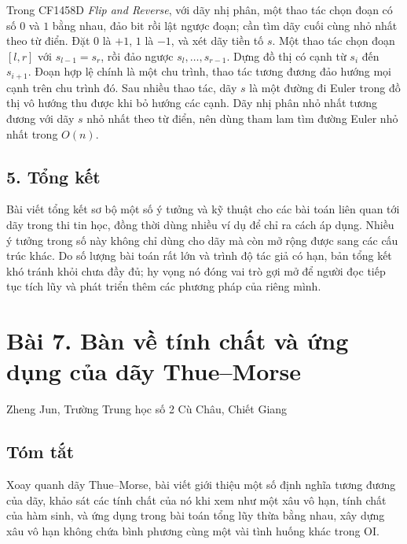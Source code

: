 \documentclass[11pt]{article}
\begin{document}
Trong CF1458D \emph{Flip and Reverse}, với dãy nhị phân, một thao tác chọn
đoạn có số \(0\) và \(1\) bằng nhau, đảo bit rồi lật ngược đoạn; cần tìm dãy
cuối cùng nhỏ nhất theo từ điển. Đặt \(0\) là \(+1\), \(1\) là \(-1\), và xét
dãy tiền tố \(s\). Một thao tác chọn đoạn \([l,r]\) với \(s_{l-1}=s_r\), rồi
đảo ngược \(s_l,\ldots,s_{r-1}\). Dựng đồ thị có cạnh từ \(s_i\) đến
\(s_{i+1}\). Đoạn hợp lệ chính là một chu trình, thao tác tương đương đảo hướng
mọi cạnh trên chu trình đó. Sau nhiều thao tác, dãy \(s\) là một đường đi Euler
trong đồ thị vô hướng thu được khi bỏ hướng các cạnh. Dãy nhị phân nhỏ nhất
tương đương với dãy \(s\) nhỏ nhất theo từ điển, nên dùng tham lam tìm đường
Euler nhỏ nhất trong \(O(n)\).

\subsection*{5. Tổng kết}

Bài viết tổng kết sơ bộ một số ý tưởng và kỹ thuật cho các bài toán liên quan
tới dãy trong thi tin học, đồng thời dùng nhiều ví dụ để chỉ ra cách áp dụng.
Nhiều ý tưởng trong số này không chỉ dùng cho dãy mà còn mở rộng được sang các
cấu trúc khác. Do số lượng bài toán rất lớn và trình độ tác giả có hạn, bản
tổng kết khó tránh khỏi chưa đầy đủ; hy vọng nó đóng vai trò gợi mở để người
đọc tiếp tục tích lũy và phát triển thêm các phương pháp của riêng mình.

\section*{Bài 7. Bàn về tính chất và ứng dụng của dãy Thue--Morse}

\begin{center}
Zheng Jun, Trường Trung học số 2 Cù Châu, Chiết Giang
\end{center}

\subsection*{Tóm tắt}

Xoay quanh dãy Thue--Morse, bài viết giới thiệu một số định nghĩa tương đương
của dãy, khảo sát các tính chất của nó khi xem như một xâu vô hạn, tính chất
của hàm sinh, và ứng dụng trong bài toán tổng lũy thừa bằng nhau, xây dựng xâu
vô hạn không chứa bình phương cùng một vài tình huống khác trong OI.
\end{document}
